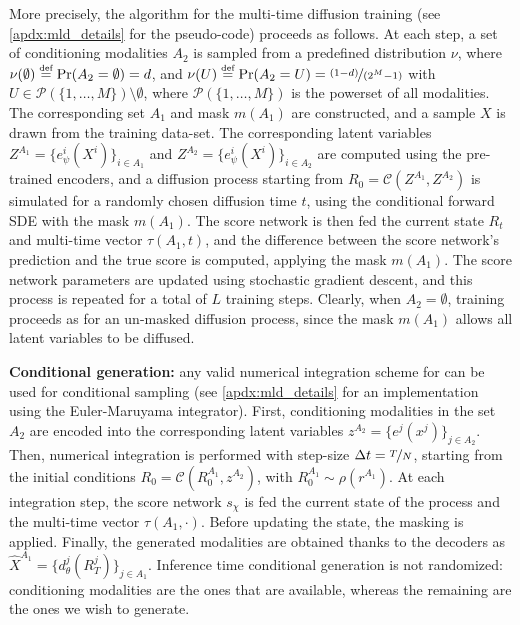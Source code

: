 More precisely, the algorithm for the multi-time diffusion training (see \ref{apdx:mld_details} for the pseudo-code) proceeds as follows. At each step, a set of conditioning modalities $A_2$ is sampled from a predefined distribution $\nu$, where $\nu(\emptyset)\defeq\Pr(A_2=\emptyset)=d$, and $\nu(U)\defeq\Pr(A_2=U)=\nicefrac{(1-d)}{(2^M-1)}$ with $U\in \mathcal{P}(\{1,\dots,M\})\setminus\emptyset$, where $\mathcal{P}(\{1,\dots,M\})$ is the powerset of all modalities. The corresponding set $A_1$ and mask $m(A_1)$ are constructed, and a sample $X$ is drawn from the training data-set. The corresponding latent variables $Z^{A_1}=\{e^i_{\psi}(X^i)\}_{i\in A_1}$ and $Z^{A_2}=\{e^i_{\psi}(X^i)\}_{i\in A_2}$ are computed using the pre-trained encoders, and a diffusion process starting from $R_0 = \mathcal{C}(Z^{A_1}, Z^{A_2})$ is simulated for a randomly chosen diffusion time $t$, using the conditional forward SDE with the mask $m(A_1)$. The score network is then fed the current state $R_t$ and multi-time vector $\tau(A_1,t)$, and the difference between the score network's prediction and the true score is computed, applying the mask $m(A_1)$. The score network parameters are updated using stochastic gradient descent, and this process is repeated for a total of $L$ training steps. Clearly, when $A_2 = \emptyset$, training proceeds as for an un-masked diffusion process, since the mask $m(A_1)$ allows all latent variables to be diffused.






\noindent \textbf{Conditional generation:} any valid numerical integration scheme for  can be used for conditional sampling (see \ref{apdx:mld_details} for an implementation using the Euler-Maruyama integrator). First, conditioning modalities in the set $A_2$ are encoded into the corresponding latent variables $z^{A_2}=\{e^j(x^{j})\}_{j\in A_2}$. Then, numerical integration is performed with step-size $\Delta t=\nicefrac{T}{N}$, starting from the initial conditions $R_0=\mathcal{C}(R^{A_1}_0,z^{A_2})$, with $R^{A_1}_0\sim \rho(r^{A_1})$. At each integration step, the score network $s_\chi$ is fed the current state of the process and the multi-time vector $\tau(A_1,\cdot)$. Before updating the state, the masking is applied. Finally, the generated modalities are obtained thanks to the decoders as $\hat{X}^{A_1}=\{d^j_\theta(R^{j}_T)\}_{j\in A_1}$.
Inference time conditional generation is not randomized: conditioning modalities are the ones that are available, whereas the remaining are the ones we wish to generate.

